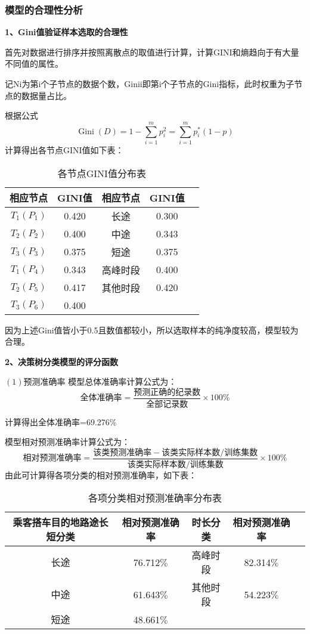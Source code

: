 \documentclass[withoutpreface,bwprint]{cumcmthesis} %
\begin{document}
\subsubsection{模型的合理性分析}
\textbf{1、Gini值验证样本选取的合理性}

首先对数据进行排序并按照离散点的取值进行计算，计算GINI和熵趋向于有大量不同值的属性。

记Ni为第i个子节点的数据个数，Ginii即第i个子节点的Gini指标，此时权重为子节点的数据量占比。

根据公式
$$
\operatorname{Gini}(D)=1-\sum_{i=1}^{m} p_{i}^{2}=\sum_{i=1}^{m} p_{i}^{*}(1-p)
$$
计算得出各节点GINI值如下表：
\begin{table}[!htbp]
	\caption{各节点GINI值分布表}\label{tab:006} \centering
	\begin{tabular}{ccccc}
		\toprule[2pt]
		相应节点 & GINI值 & 相应节点 & GINI值\\
		\midrule[1pt]
		$T_{1}\left(P_{1}\right)$ & 0.420 & 长途 & 0.300\\
     	$T_{2}\left(P_{2}\right)$ & 0.400 & 中途 & 0.343\\
		$T_{3}\left(P_{3}\right)$ & 0.375 & 短途 & 0.375\\
		$T_{1}\left(P_{4}\right)$ & 0.343 & 高峰时段 & 0.400\\
		$T_{2}\left(P_{5}\right)$ & 0.417 & 其他时段 &0.420\\
		$T_{3}\left(P_{6}\right)$ & 0.400\\
		\bottomrule[1.5pt]
	\end{tabular}
\end{table}

因为上述Gini值皆小于0.5且数值都较小，所以选取样本的纯净度较高，模型较为合理。

\textbf{2、决策树分类模型的评分函数}

$(1)$预测准确率
模型总体准确率计算公式为：
$$
\text{全体准确率}=\frac{\text{预测正确的纪录数}}{\text{全部记录数}} \times 100 \%
$$

计算得出全体准确率=69.276$\%$

模型相对预测准确率计算公式为：
$$
\text{相对预测准确率}=\frac{{\text{该类预测准确率}}-{\text{该类实际样本数}}/{\text{训练集数}}}{{\text{该类实际样本数}}/{\text{训练集数}}} \times 100 \%
$$
由此可计算得各项分类的相对预测准确率，如下表：
\begin{table}[!h]
	\caption{各项分类相对预测准确率分布表}\label{tab:007} \centering
	\begin{tabular}{ccccc}
		\toprule[2pt]
		乘客搭车目的地路途长短分类& 相对预测准确率 & 时长分类 & 相对预测准确率\\
		\midrule[1pt]
		长途 & 76.712$\%$ & 高峰时段 & 82.314$\%$\\
		中途 & 61.643$\%$ & 其他时段 & 54.223$\%$\\
		短途 & 48.661$\%$\\
		\bottomrule[1.5pt]
	\end{tabular}
\end{table}
\end{document}
